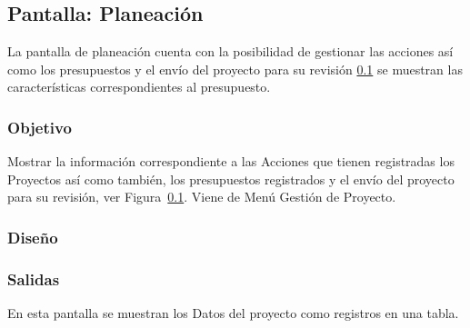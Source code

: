\subsection{Pantalla: Planeación}\label{IUPlaneacion}
La pantalla de planeación cuenta con la posibilidad de gestionar las acciones así como los presupuestos y el envío del proyecto para su revisión \ref{IUPlaneacion} se muestran las características correspondientes al presupuesto.

\subsubsection{Objetivo}
  Mostrar la información correspondiente a las Acciones que tienen registradas los Proyectos así como también, los presupuestos registrados y el envío del proyecto 
  para su revisión, ver Figura~\ref{IUPlaneacion}. Viene de Menú Gestión de Proyecto.

\subsubsection{Diseño}

\subsubsection{Salidas}
  En esta pantalla se muestran los Datos del proyecto como registros en una tabla.



